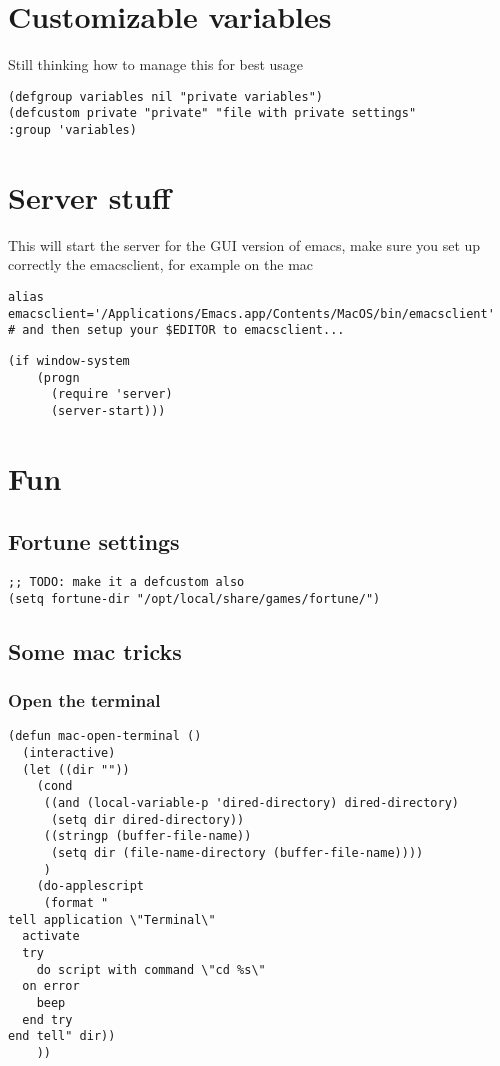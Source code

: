 \documentclass[11pt]{article}
\begin{document}
  
\section{Customizable variables}
\label{sec-39}

  Still thinking how to manage this for best usage
\begin{verbatim}
(defgroup variables nil "private variables")
(defcustom private "private" "file with private settings"
:group 'variables)
\end{verbatim}
\section{Server stuff}
\label{sec-40}

  This will start the server for the GUI version of emacs, make sure you set up correctly the emacsclient, for example on the mac
\begin{verbatim}
alias emacsclient='/Applications/Emacs.app/Contents/MacOS/bin/emacsclient'
# and then setup your $EDITOR to emacsclient...
\end{verbatim}


\begin{verbatim}
(if window-system
    (progn
      (require 'server)
      (server-start)))
\end{verbatim}

  
\section{Fun}
\label{sec-41}
\subsection{Fortune settings}
\label{sec-41.1}

\begin{verbatim}
;; TODO: make it a defcustom also 
(setq fortune-dir "/opt/local/share/games/fortune/")
\end{verbatim}
\subsection{Some mac tricks}
\label{sec-41.2}
\subsubsection{Open the terminal}
\label{sec-41.2.1}

\begin{verbatim}
(defun mac-open-terminal ()
  (interactive)
  (let ((dir ""))
    (cond
     ((and (local-variable-p 'dired-directory) dired-directory)
      (setq dir dired-directory))
     ((stringp (buffer-file-name))
      (setq dir (file-name-directory (buffer-file-name))))
     )
    (do-applescript
     (format "
tell application \"Terminal\"
  activate
  try
    do script with command \"cd %s\"
  on error
    beep
  end try
end tell" dir))
    ))
\end{verbatim}
\end{document}
